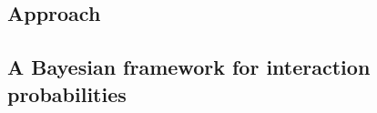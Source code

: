 \documentclass[12pt]{article}
\begin{document}
\begin{spacing}{1.5}
\section*{Approach}

  \subsection*{A Bayesian framework for interaction probabilities}






  






\end{spacing}
\end{document}
